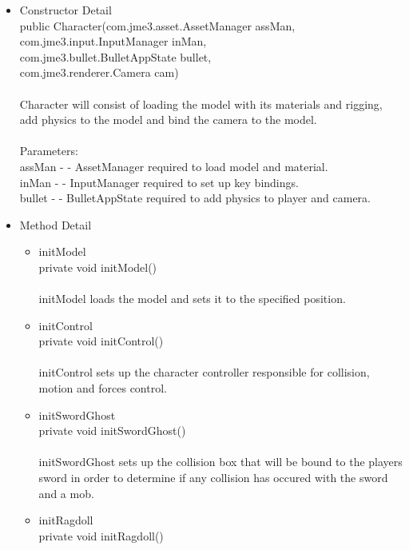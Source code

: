 \documentclass[letterpaper]{article}
\begin{document}
\begin{itemize}
\begin{itemize}
										\end{itemize}
								\item	Constructor Detail \\
										public Character(com.jme3.asset.AssetManager assMan, \\
		        com.jme3.input.InputManager inMan, \\
		        com.jme3.bullet.BulletAppState bullet, \\
		        com.jme3.renderer.Camera cam) \\ \\
										Character will consist of loading the model with its materials and rigging, add physics to the model and bind the camera to the model. \\ \\
										Parameters: \\
										assMan - - AssetManager required to load model and material. \\
										inMan - - InputManager required to set up key bindings. \\
										bullet - - BulletAppState required to add physics to player and camera.
								\item	Method Detail 
										\begin{itemize}
											\item	initModel \\
													private void initModel() \\ \\
													initModel loads the model and sets it to the specified position. \\
											\item	initControl \\
													private void initControl() \\ \\
													initControl sets up the character controller responsible for collision, motion and forces control.
											\item	initSwordGhost \\
													private void initSwordGhost() \\ \\
													initSwordGhost sets up the collision box that will be bound to the players sword in order to determine if any collision has occured with the sword and a mob.
											\item	initRagdoll \\
													private void initRagdoll() \\

\end{itemize}
\end{itemize}
\end{document}
